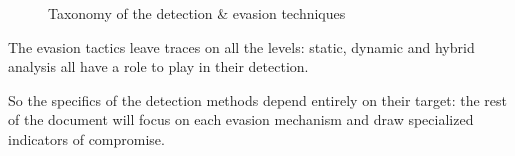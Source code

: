 \begin{figure}[ht]
\caption{Taxonomy of the detection \& evasion techniques} \label{fig:taxonomy}
\end{figure}

The evasion tactics leave traces on all the levels: static, dynamic and hybrid analysis all have a role to play in their detection.

So the specifics of the detection methods depend entirely on their target: the rest of the document will focus on each evasion mechanism and draw specialized indicators of compromise.
